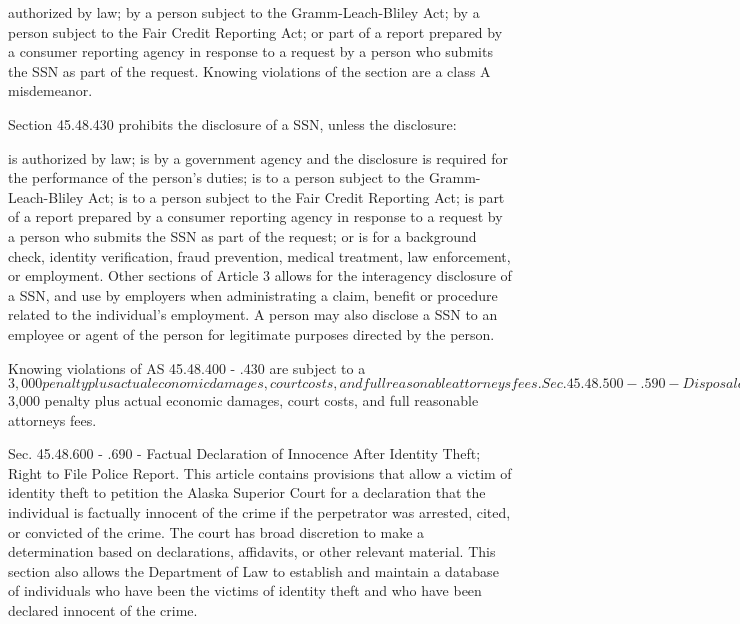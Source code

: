 authorized by law;
by a person subject to the Gramm-Leach-Bliley Act;
by a person subject to the Fair Credit Reporting Act; or
part of a report prepared by a consumer reporting agency in response to a request by a person who submits the SSN as part of the request.
Knowing violations of the section are a class A misdemeanor.

Section 45.48.430 prohibits the disclosure of a SSN, unless the disclosure:

is authorized by law;
is by a government agency and the disclosure is required for the performance of the person's duties;
is to a person subject to the Gramm-Leach-Bliley Act;
is to a person subject to the Fair Credit Reporting Act;
is part of a report prepared by a consumer reporting agency in response to a request by a person who submits the SSN as part of the request; or
is for a background check, identity verification, fraud prevention, medical treatment, law enforcement, or employment.
Other sections of Article 3 allows for the interagency disclosure of a SSN, and use by employers when administrating a claim, benefit or procedure related to the individual's employment.  A person may also disclose a SSN to an employee or agent of the person for legitimate purposes directed by the person.

Knowing violations of AS 45.48.400 - .430 are subject to a $3,000 penalty plus actual economic damages, court costs, and full reasonable attorneys fees.

Sec. 45.48.500 - .590 - Disposal of Records
This article contains provisions that require a business and a government agency to take reasonable measures to protect against unauthorized access to, or use of, records when disposing of records containing personal information.  To comply with this requirement, a business or government agency can implement compliance and monitoring policies that require the destruction of personal information, or enter a contract with a third party for the disposal and destruction of the records.  A business or government agency is not liable for the disposal after relinquishing control of the records to a third party that is in the business of record destruction.

Knowing violations of this section are subject to a $3,000 penalty plus actual economic damages, court costs, and full reasonable attorneys fees.

Sec. 45.48.600 - .690 - Factual Declaration of Innocence After Identity Theft; Right to File Police Report.
This article contains provisions that allow a victim of identity theft to petition the Alaska Superior Court for a declaration that the individual is factually innocent of the crime if the perpetrator was arrested, cited, or convicted of the crime.  The court has broad discretion to make a determination based on declarations, affidavits, or other relevant material.  This section also allows the Department of Law to establish and maintain a database of individuals who have been the victims of identity theft and who have been declared innocent of the crime.

